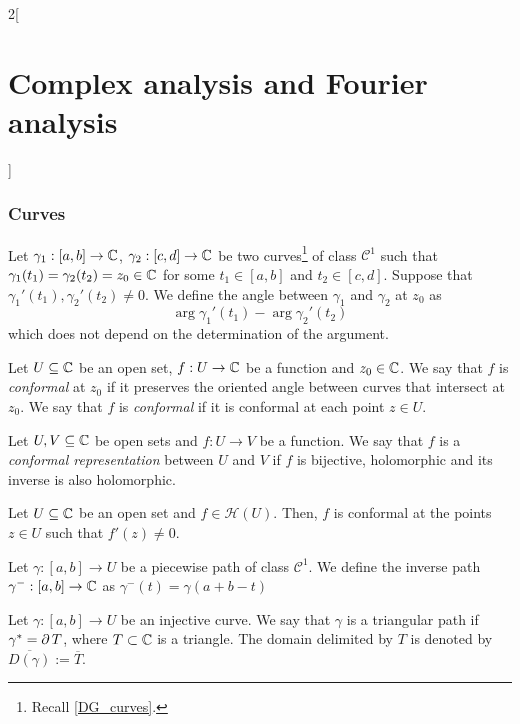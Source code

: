 \documentclass[../../../main.tex]{subfiles}
\begin{document}
\begin{multicols}{2}[\section{Complex analysis and Fourier analysis}]
  \subsubsection{Curves}
  \begin{definition}
    Let $\gamma_1:[a,b]\rightarrow\mathbb{C}$, $\gamma_2:[c,d]\rightarrow\mathbb{C}$ be two curves\footnote{Recall \cref{DG_curves}.} of class $\mathcal{C}^1$ such that $\gamma_1(t_1)=\gamma_2(t_2)=z_0\in\mathbb{C}$ for some $t_1\in[a,b]$ and $t_2\in[c,d]$. Suppose that ${\gamma_1}'(t_1),{\gamma_2}'(t_2)\ne 0$. We define the angle between $\gamma_1$ and $\gamma_2$ at $z_0$ as $$\arg{\gamma_1}'(t_1)-\arg{\gamma_2}'(t_2)$$ which does not depend on the determination of the argument.
  \end{definition}
  \begin{definition}
    Let $U\subseteq \mathbb{C}$ be an open set, $f:U\rightarrow\mathbb{C}$ be a function and $z_0\in\mathbb{C}$. We say that $f$ is \emph{conformal} at $z_0$ if it preserves the oriented angle between curves that intersect at $z_0$. We say that $f$ is \emph{conformal} if it is conformal at each point $z\in U$.
  \end{definition}
  \begin{definition}
    Let $U,V\subseteq \mathbb{C}$ be open sets and $f:U\rightarrow V$ be a function. We say that $f$ is a \emph{conformal representation} between $U$ and $V$ if $f$ is bijective, holomorphic and its inverse is also holomorphic.
  \end{definition}
  \begin{theorem}
    Let $U\subseteq \mathbb{C}$ be an open set and $f\in\mathcal{H}(U)$. Then, $f$ is conformal at the points $z\in U$ such that $f'(z)\ne 0$.
  \end{theorem}
  \begin{definition}
    Let $\gamma:[a,b]\rightarrow U$ be a piecewise path of class $\mathcal{C}^1$. We define the inverse path $\gamma^-:[a,b]\rightarrow\mathbb{C}$ as $\gamma^-(t)=\gamma(a+b-t)$
  \end{definition}
  \begin{definition}
    Let $\gamma:[a,b]\rightarrow U$ be an injective curve. We say that $\gamma$ is a triangular path if $\gamma^*=\operatorname{\partial} T$, where $T\subset\mathbb{C}$ is a triangle. The domain delimited by $T$ is denoted by $\overline{D(\gamma)}:=\overline{T}$.
  \end{definition}

\end{multicols}
\end{document}
